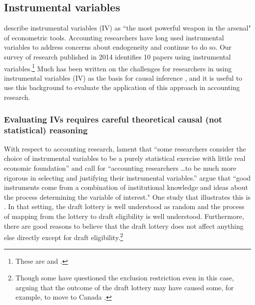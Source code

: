 \documentclass[12pt,reqno,titlepage]{amsart}
\theoremstyle{definition}
\begin{document}
\begin{doublespace}
\subsection{Instrumental variables}
\citet[p.114]{Angrist:2008vk} describe instrumental variables (IV) as ``the most powerful weapon in the arsenal" of econometric tools. 
Accounting researchers have long used instrumental variables to address concerns about endogeneity \citep{Larcker:2010fq,Lennox:2012it} and continue to do so.
Our survey of research published in 2014 identifies 10 papers using instrumental variables.\footnote{
These are \citet{Cannon:2014im,Cohen:2014jl,Kim:2014fm,Vermeer:2014bs,Fox:2014io,Guedhami:2013cj,Houston:2014hv,deFranco:2014ct,Erkens:2014hj} and \citet{Correia:2014fp}.}
Much has been written on the challenges for researchers in using instrumental variables (IV) as the basis for causal inference \citep[e.g.,][]{Roberts:2013cz}, and it is useful to use this background to evaluate the application of this approach in accounting research. 

\subsubsection{Evaluating IVs requires careful theoretical causal (not statistical) reasoning}

With respect to accounting research, \citet{Larcker:2010fq} lament that ``some researchers consider the choice of instrumental variables to be a purely statistical exercise with little real economic foundation'' and call for 
``accounting researchers \dots to be much more rigorous in selecting and justifying their instrumental variables.'' 
\citet[p.117]{Angrist:2008vk} argue that ``good instruments come from a combination of institutional knowledge and ideas about the process determining the variable of interest."
One study that illustrates this is \citet{Angrist:1990dk}.
In that setting, the draft lottery is well understood as random and the process of mapping from the lottery to draft eligibility is well understood.
Furthermore, there are good reasons to believe that the draft lottery does not affect anything else directly except for draft eligibility.\footnote{Though some have questioned the exclusion restriction even in this case, arguing that the outcome of the draft lottery may have caused some, for example, to move to Canada \citep[see][]{Imbens:2015aa}.}


\end{doublespace}
\end{document}
